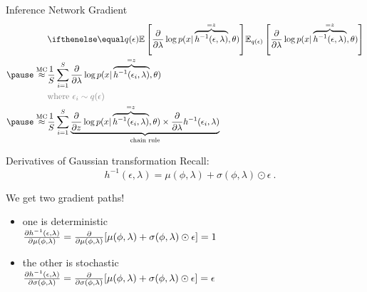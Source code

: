\documentclass[14pt]{beamer}
\begin{document}
\begin{frame}{Inference Network Gradient}
\vspace{-10pt}
\begin{equation*}
\begin{aligned}
&\E[q(\epsilon)]{\pdv{\lambda} \log p(x| \overbrace{h^{-1}(\epsilon, \lambda)}^{=z}, \theta)} \\ \pause
\overset{\text{MC}}{\approx} &\frac{1}{S}\sum_{i=1}^{S} \pdv{\lambda} \log p(x| \overbrace{h^{-1}(\epsilon_i, \lambda)}^{=z}, \theta) \\
&\textcolor{gray}{\text{where }\epsilon_i \sim q(\epsilon)} \\ \pause
\overset{\text{MC}}{\approx} &\frac{1}{S}\sum_{i=1}^{S} \underbrace{\pdv{z} \log p(x| \overbrace{h^{-1}(\epsilon_i, \lambda)}^{=z}, \theta) \times \pdv{\lambda} h^{-1}(\epsilon_i, \lambda)}_{\text{chain rule}}
\end{aligned}
\end{equation*}
\end{frame}

\begin{frame}{Derivatives of Gaussian transformation}
Recall: $$\quad h^{-1}(\epsilon, \lambda) = \mu(\phi,\lambda) + \sigma(\phi,\lambda) \odot \epsilon \ . $$

We get two gradient paths! \pause \\

\begin{itemize}
	\item one is \alert{deterministic}\\
	$\pdv{h^{-1}(\epsilon, \lambda)}{\mu(\phi,\lambda)} = \pdv{\mu(\phi,\lambda)}[\mu(\phi,\lambda) + \sigma(\phi,\lambda) \odot \epsilon] = 1$ \pause
	\item the other is  \alert{stochastic}\\
	$\pdv{h^{-1}(\epsilon, \lambda)}{\sigma(\phi,\lambda)} = \pdv{\sigma(\phi,\lambda)}[ \mu(\phi,\lambda) + \sigma(\phi,\lambda) \odot \epsilon] = \epsilon$
\end{itemize}

\end{frame}
\end{document}

